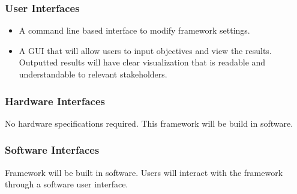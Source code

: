 \documentclass[draftclsnofoot, onecolumn, compsoc, 10pt]{IEEEtran}
\begin{document}
\subsubsection{User Interfaces}
\begin{itemize}
\item A command line based interface to modify framework settings.\\
\item A GUI that will allow users to input objectives and view the results. Outputted results will have clear visualization that is readable and understandable to relevant stakeholders. 
\end{itemize}

\subsubsection{Hardware Interfaces}
No hardware specifications required. This framework will be build in software.

\subsubsection{Software Interfaces}
Framework will be built in software. %
Users will interact with the framework through a software user interface.

\end{document}

